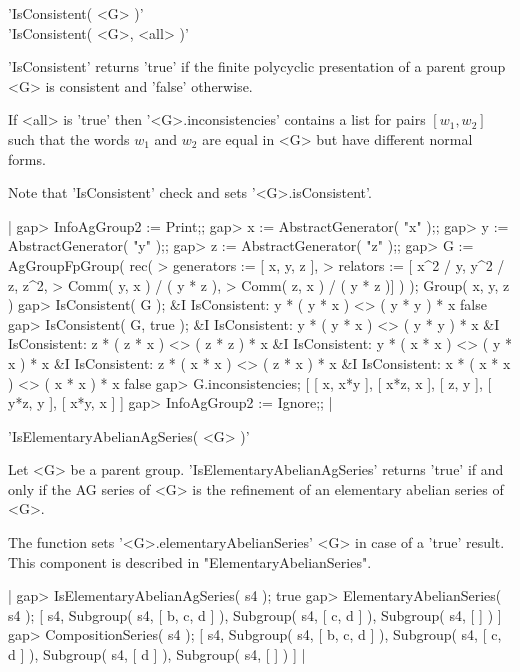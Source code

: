 
'IsConsistent( <G> )' \\
'IsConsistent( <G>, <all> )'

'IsConsistent' returns  'true' if the finite polycyclic presentation of a
parent group <G> is consistent and 'false' otherwise.

If <all> is 'true' then '<G>.inconsistencies'  contains  a list for pairs
$[ w_1, w_2 ]$ such that the words $w_1$  and $w_2$ are equal in  <G> but
have different normal forms.

Note that  'IsConsistent'  check and sets '<G>.isConsistent'.

|    gap> InfoAgGroup2 := Print;;
    gap> x := AbstractGenerator( "x" );;
    gap> y := AbstractGenerator( "y" );;
    gap> z := AbstractGenerator( "z" );;
    gap> G := AgGroupFpGroup( rec(
    >       generators := [ x, y, z ],
    >       relators   := [ x^2 / y, y^2 / z, z^2,
    >                       Comm( y, x ) / ( y * z ),
    >                       Comm( z, x ) / ( y * z )] ) );
    Group( x, y, z )
    gap> IsConsistent( G );
    &I  IsConsistent: y * ( y * x ) <> ( y * y ) * x
    false
    gap> IsConsistent( G, true );
    &I  IsConsistent: y * ( y * x ) <> ( y * y ) * x
    &I  IsConsistent: z * ( z * x ) <> ( z * z ) * x
    &I  IsConsistent: y * ( x * x ) <> ( y * x ) * x
    &I  IsConsistent: z * ( x * x ) <> ( z * x ) * x
    &I  IsConsistent: x * ( x * x ) <> ( x * x ) * x
    false
    gap> G.inconsistencies;
    [ [ x, x*y ], [ x*z, x ], [ z, y ], [ y*z, y ], [ x*y, x ] ]
    gap> InfoAgGroup2 := Ignore;; |


'IsElementaryAbelianAgSeries( <G> )'

Let <G> be  a parent group.  'IsElementaryAbelianAgSeries' returns 'true'
if and only if the AG series  of <G> is  the refinement of  an elementary
abelian series of <G>.

The function sets '<G>.elementaryAbelianSeries' <G> in  case of a  'true'
result.  This component is described in "ElementaryAbelianSeries".

|    gap> IsElementaryAbelianAgSeries( s4 );
    true
    gap> ElementaryAbelianSeries( s4 );
    [ s4, Subgroup( s4, [ b, c, d ] ), Subgroup( s4, [ c, d ] ),
      Subgroup( s4, [  ] ) ]
    gap> CompositionSeries( s4 );
    [ s4, Subgroup( s4, [ b, c, d ] ), Subgroup( s4, [ c, d ] ),
      Subgroup( s4, [ d ] ), Subgroup( s4, [  ] ) ] |

